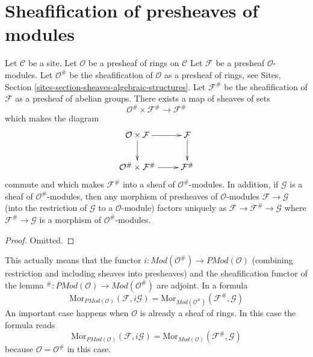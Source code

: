 \section{Sheafification of presheaves of modules}
\label{section-sheafification-presheaves-modules}

\begin{lemma}
\label{lemma-sheafification-presheaf-modules}
Let $\mathcal{C}$ be a site.
Let $\mathcal{O}$ be a presheaf of rings on $\mathcal{C}$
Let $\mathcal{F}$ be a presheaf $\mathcal{O}$-modules.
Let $\mathcal{O}^\#$ be the sheafification of $\mathcal{O}$ as a presheaf
of rings, see Sites, Section \ref{sites-section-sheaves-algebraic-structures}.
Let $\mathcal{F}^\#$ be the sheafification of $\mathcal{F}$
as a presheaf of abelian groups. There exists a map of
sheaves of sets
$$
\mathcal{O}^\# \times \mathcal{F}^\#
\longrightarrow
\mathcal{F}^\#
$$
which makes the diagram
$$
\xymatrix{
\mathcal{O} \times \mathcal{F} \ar[r] \ar[d] &
\mathcal{F} \ar[d] \\
\mathcal{O}^\# \times \mathcal{F}^\# \ar[r] &
\mathcal{F}^\#
}
$$
commute and which makes $\mathcal{F}^\#$ into a sheaf
of $\mathcal{O}^\#$-modules. In addition, if $\mathcal{G}$
is a sheaf of $\mathcal{O}^\#$-modules, then any morphism
of presheaves of $\mathcal{O}$-modules $\mathcal{F} \to \mathcal{G}$
(into the restriction of $\mathcal{G}$ to a $\mathcal{O}$-module)
factors uniquely as $\mathcal{F} \to \mathcal{F}^\# \to \mathcal{G}$
where $\mathcal{F}^\# \to \mathcal{G}$ is a morphism of
$\mathcal{O}^\#$-modules.
\end{lemma}

\begin{proof}
Omitted.
\end{proof}

\noindent
This actually means that the functor
$i : \textit{Mod}(\mathcal{O}^\#) \to \textit{PMod}(\mathcal{O})$
(combining restriction and including sheaves into presheaves)
and the sheafification functor of the lemma
${}^\# : \textit{PMod}(\mathcal{O}) \to \textit{Mod}(\mathcal{O}^\#)$
are adjoint. In a formula
$$
\text{Mor}_{\textit{PMod}(\mathcal{O})}(\mathcal{F}, i\mathcal{G})
=
\text{Mor}_{\textit{Mod}(\mathcal{O}^\#)}(\mathcal{F}^\#, \mathcal{G})
$$
An important case happens when $\mathcal{O}$ is already a sheaf of
rings. In this case the formula reads
$$
\text{Mor}_{\textit{PMod}(\mathcal{O})}(\mathcal{F}, i\mathcal{G})
=
\text{Mor}_{\textit{Mod}(\mathcal{O})}(\mathcal{F}^\#, \mathcal{G})
$$
because $\mathcal{O} = \mathcal{O}^\#$ in this case.

